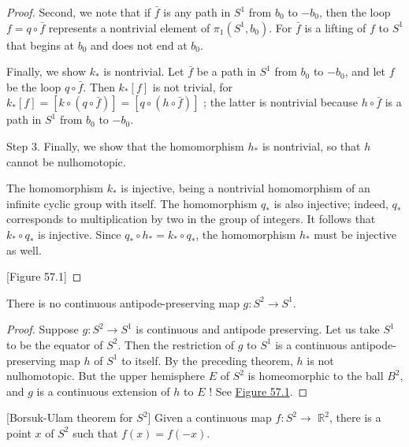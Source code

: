 \begin{proof}
Second, we note that if \(\bar{f}\) is any path in \(S^{1}\) from \(b_{0}\) to \(- b_{0}\), then the loop \(f = q \circ \bar{f}\) represents a nontrivial element of \({\pi }_{1}( {S^{1},b_{0}})\). For \(\bar{f}\) is a lifting of \(f\) to \(S^{1}\) that begins at \(b_{0}\) and does not end at \(b_{0}\).

Finally, we show \(k_{ * }\) is nontrivial. Let \(\bar{f}\) be a path in \(S^{1}\) from \(b_{0}\) to \(- b_{0}\), and let \(f\) be the loop \(q \circ \bar{f}\). Then \(k_{ * }[ f]\) is not trivial, for \(k_{ * }[ f] = [ {k \circ ( {q \circ \bar{f}}) }] = [ {q \circ ( {h \circ \bar{f}}) }]\) ; the latter is nontrivial because \(h \circ \bar{f}\) is a path in \(S^{1}\) from \(b_{0}\) to \(- b_{0}\).

Step 3. Finally, we show that the homomorphism \(h_{ * }\) is nontrivial, so that \(h\) cannot be nulhomotopic.

The homomorphism \(k_{ * }\) is injective, being a nontrivial homomorphism of an infinite cyclic group with itself. The homomorphism \(q_{ * }\) is also injective; indeed, \(q_{ * }\) corresponds to multiplication by two in the group of integers. It follows that \(k_{ * } \circ {q}_{ * }\) is injective. Since \(q_{ * } \circ {h}_{ * } = k_{ * } \circ {q}_{ * }\), the homomorphism \(h_{ * }\) must be injective as well.

[Figure 57.1]
\end{proof}
\begin{theorem}
\label{thm:\thetheorem}
There is no continuous antipode-preserving map \(g : S^{2} \rightarrow {S}^{1}\).
\end{theorem}

\begin{proof}
Suppose \(g : S^{2} \rightarrow {S}^{1}\) is continuous and antipode preserving. Let us take \(S^{1}\) to be the equator of \(S^{2}\). Then the restriction of \(g\) to \(S^{1}\) is a continuous antipode-preserving map \(h\) of \(S^{1}\) to itself. By the preceding theorem, \(h\) is not nulhomotopic. But the upper hemisphere \(E\) of \(S^{2}\) is homeomorphic to the ball \(B^{2}\), and \(g\) is a continuous extension of \(h\) to \(E\) ! See \hyperref[fig:57.1]{Figure 57.1}.
\end{proof}
\begin{theorem}
\label{thm:\thetheorem}[Borsuk-Ulam theorem for \(S^{2}\)]
Given a continuous map \(f : S^{2} \rightarrow\) \(\mathbb{R}^{2}\), there is a point \(x\) of \(S^{2}\) such that \(f(x) = f( {-x})\).
\end{theorem}

